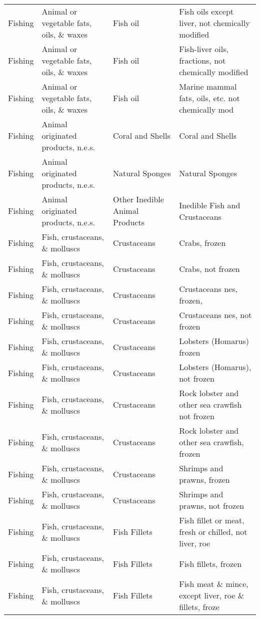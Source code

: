 \begin{appendices}
\begin{xltabular}{\textwidth}{|p{0.10\textwidth}|p{0.27\textwidth}|p{0.25\textwidth}|p{0.26\textwidth}|}
		\hline
		\endlastfoot
		Fishing & Animal or vegetable fats, oils, \& waxes & Fish oil & Fish oils except liver, not chemically modified \\
Fishing & Animal or vegetable fats, oils, \& waxes & Fish oil & Fish-liver oils, fractions, not chemically modified \\
Fishing & Animal or vegetable fats, oils, \& waxes & Fish oil & Marine mammal fats, oils, etc. not chemically mod\\
Fishing & Animal originated products, n.e.s. & Coral and Shells & Coral and Shells \\
Fishing & Animal originated products, n.e.s. & Natural Sponges & Natural Sponges \\
Fishing & Animal originated products, n.e.s. & Other Inedible Animal Products & Inedible Fish and Crustaceans \\
Fishing & Fish, crustaceans, \& molluscs & Crustaceans & Crabs, frozen \\
Fishing & Fish, crustaceans, \& molluscs & Crustaceans & Crabs, not frozen \\
Fishing & Fish, crustaceans, \& molluscs & Crustaceans & Crustaceans nes, frozen, \\
Fishing & Fish, crustaceans, \& molluscs & Crustaceans & Crustaceans nes, not frozen \\
Fishing & Fish, crustaceans, \& molluscs & Crustaceans & Lobsters (Homarus) frozen \\
Fishing & Fish, crustaceans, \& molluscs & Crustaceans & Lobsters (Homarus), not frozen \\
Fishing & Fish, crustaceans, \& molluscs & Crustaceans & Rock lobster and other sea crawfish not frozen \\
Fishing & Fish, crustaceans, \& molluscs & Crustaceans & Rock lobster and other sea crawfish, frozen \\
Fishing & Fish, crustaceans, \& molluscs & Crustaceans & Shrimps and prawns, frozen \\
Fishing & Fish, crustaceans, \& molluscs & Crustaceans & Shrimps and prawns, not frozen \\
Fishing & Fish, crustaceans, \& molluscs & Fish Fillets & Fish fillet or meat, fresh or chilled, not liver, roe \\
Fishing & Fish, crustaceans, \& molluscs & Fish Fillets & Fish fillets, frozen \\
Fishing & Fish, crustaceans, \& molluscs & Fish Fillets & Fish meat \& mince, except liver, roe \& fillets, froze \\

\end{xltabular}
\end{appendices}
